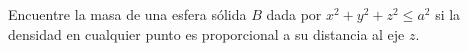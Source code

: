 \item Encuentre la masa de una esfera sólida $B$ dada por $x^2 + y^2 + z^2 \le a^2$ si la densidad en cualquier punto es proporcional a su distancia al eje $z$.
